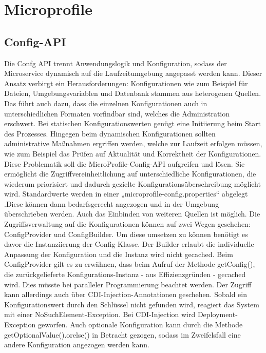 \section{Microprofile}

\subsection{Config-API} 

Die Confg API trennt Anwendungslogik und Konfiguration, sodass der Microservice dynamisch auf die Laufzeitumgebung angepasst werden kann. Dieser Ansatz verbirgt ein Herausforderungen: Konfigurationen wie zum Beispiel für Dateien, Umgebungsvariablen und Datenbank stammen aus heterogenen Quellen. Das führt auch dazu, dass die einzelnen Konfigurationen auch in unterschiedlichen Formaten vorfindbar sind, welches die Administration erschwert. Bei statischen Konfigurationswerten genügt eine Initiierung beim Start des Prozesses. Hingegen beim dynamischen Konfigurationen sollten administrative Maßnahmen ergriffen werden, welche zur Laufzeit erfolgen müssen, wie zum Beispiel das Prüfen auf Aktualität und Korrektheit der Konfigurationen. Diese Problematik soll die MicroProfile-Config-API aufgreifen und lösen. Sie ermöglicht die Zugriffvereinheitlichung auf unterschiedliche Konfigurationen, die wiederum priorisiert und dadurch gezielte Konfigurationsüberschreibung möglicht wird. Standardwerte werden in einer „microprofile-config.properties“ abgelegt .Diese können dann bedarfsgerecht angezogen und in der Umgebung überschrieben werden. Auch das Einbinden von weiteren Quellen ist möglich.
Die Zugriffsverwaltung auf die Konfigurationen können auf zwei Wegen geschehen: ConfigProvider und ConfigBuilder. Um diese umsetzen zu können benötigt es davor die Instanziierung der Config-Klasse. Der Builder erlaubt die individuelle Anpassung der Konfiguration und die Instanz wird nicht gecached. Beim ConfigProvider gilt es zu erwähnen, dass beim Aufruf der Methode getConfig(), die zurückgelieferte Konfigurations-Instanz - aus Effizienzgründen - gecached wird. Dies müsste bei paralleler Programmierung beachtet werden. Der Zugriff kann allerdings auch über CDI-Injection-Annotationen geschehen. Sobald ein Konfigurationswert durch den Schlüssel nicht gefunden wird, reagiert das System mit einer NoSuchElement-Exception. Bei CDI-Injection wird Deployment-Exception geworfen. Auch optionale Konfiguration kann durch die Methode getOptionalValue().orelse() in Betracht gezogen, sodass im Zweifelsfall eine andere Konfiguration angezogen werden kann. 

